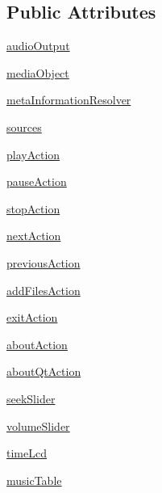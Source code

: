 \subsection*{Public Attributes}
\begin{DoxyCompactItemize}
\item 
\hyperlink{classmusicplayer_1_1MainWindow_a8a216b8899e4bed619f00a245c44321e}{audio\+Output}
\item 
\hyperlink{classmusicplayer_1_1MainWindow_af72f7b393ab61844b51899148504027b}{media\+Object}
\item 
\hyperlink{classmusicplayer_1_1MainWindow_a79838b60608f8ecf5086785245ecaa4d}{meta\+Information\+Resolver}
\item 
\hyperlink{classmusicplayer_1_1MainWindow_a14a1cfad9faa3824d59563708ac3065b}{sources}
\item 
\hyperlink{classmusicplayer_1_1MainWindow_a2cd4dc902026609bc3da527646e12de0}{play\+Action}
\item 
\hyperlink{classmusicplayer_1_1MainWindow_adcdc588f0445f96a57504bc4142f0b6c}{pause\+Action}
\item 
\hyperlink{classmusicplayer_1_1MainWindow_acb7d2093684a62e8981185ef3935145b}{stop\+Action}
\item 
\hyperlink{classmusicplayer_1_1MainWindow_a55284710791d4e769d4c4a7b8ce9a9da}{next\+Action}
\item 
\hyperlink{classmusicplayer_1_1MainWindow_ad34a6075aa3aa9a22c477404a014d134}{previous\+Action}
\item 
\hyperlink{classmusicplayer_1_1MainWindow_a32777e141cc66d803aa1b929475712a3}{add\+Files\+Action}
\item 
\hyperlink{classmusicplayer_1_1MainWindow_ac23fe895212c866df8fcbd1ba03445ee}{exit\+Action}
\item 
\hyperlink{classmusicplayer_1_1MainWindow_a1bbee28e855d7370a9d5aa0e50f361bf}{about\+Action}
\item 
\hyperlink{classmusicplayer_1_1MainWindow_a048287d07fd344c4272f7833ddc47d49}{about\+Qt\+Action}
\item 
\hyperlink{classmusicplayer_1_1MainWindow_aad5cfa9dda2aa32edf277e31b9bcd32b}{seek\+Slider}
\item 
\hyperlink{classmusicplayer_1_1MainWindow_aaaa223871b730484ff563dae272fa620}{volume\+Slider}
\item 
\hyperlink{classmusicplayer_1_1MainWindow_a61dc2311d27cda4cb6a337c6e95e0554}{time\+Lcd}
\item 
\hyperlink{classmusicplayer_1_1MainWindow_a4a4a74e2f9bc9117c41d6a31742362ec}{music\+Table}
\end{DoxyCompactItemize}


